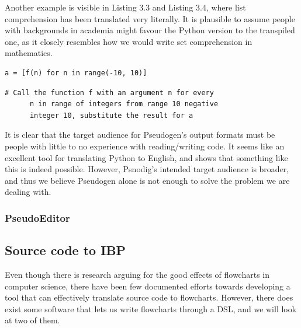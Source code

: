 Another example is visible in Listing 3.3 and Listing 3.4, where list comprehension has been translated very literally. It is plausible to assume people with backgrounds in academia might favour the Python version to the transpiled one, as it closely resembles how we would write set comprehension in mathematics. \hfill \\

\begin{lstlisting}[caption={A list comprehension of applying f(n) to integers in the range -10 to 10, and placing the results in a list}, captionpos=b]
    a = [f(n) for n in range(-10, 10)]
\end{lstlisting}

\begin{lstlisting}[caption={The result of transpiling the code in Listing ?? with Pseudogen}, captionpos=b]
    # Call the function f with an argument n for every
      n in range of integers from range 10 negative
      integer 10, substitute the result for a
\end{lstlisting}

It is clear that the target audience for Pseudogen's output formats must be people with little to no experience with reading/writing code. It seems like an excellent tool for translating Python to English, and shows that something like this is indeed possible. However, Psnodig's intended target audience is broader, and thus we believe Pseudogen alone is not enough to solve the problem we are dealing with.

\subsubsection{PseudoEditor}



\subsection{Source code to IBP}

Even though there is research arguing for the good effects of flowcharts in computer science, there have been few documented efforts towards developing a tool that can effectively translate source code to flowcharts. However, there does exist some software that lets us write flowcharts through a DSL, and we will look at two of them.

